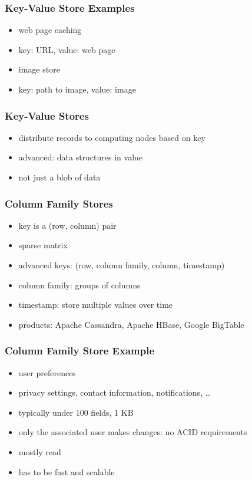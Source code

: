 \documentclass[dvipsnames]{beamer}
\theoremstyle{plain}
\begin{document}
\begin{frame}
  \frametitle{Key-Value Store Examples}

  \begin{itemize}
    \item web page caching
    \item key: URL, value: web page

    \pause
    \medskip
    \item image store
    \item key: path to image, value: image
  \end{itemize}
\end{frame}

\begin{frame}
  \frametitle{Key-Value Stores}

  \begin{itemize}
    \item distribute records to computing nodes based on key

    \medskip
    \item advanced: data structures in value
    \item not just a blob of data
  \end{itemize}
\end{frame}

\begin{frame}
  \frametitle{Column Family Stores}

  \begin{itemize}
    \item key is a (row, column) pair
    \item sparse matrix

    \pause
    \medskip
    \item advanced keys: (row, column family, column, timestamp)
    \item column family: groups of columns
    \item timestamp: store multiple values over time
  \end{itemize}

  \bigskip
  \begin{itemize}
    \item products: Apache Cassandra, Apache HBase, Google BigTable
  \end{itemize}
\end{frame}

\begin{frame}
  \frametitle{Column Family Store Example}

  \begin{itemize}
    \item user preferences
    \item privacy settings, contact information, notifications, \ldots
    \item typically under 100 fields, 1 KB

    \medskip
    \item only the associated user makes changes: no ACID requirements
    \item mostly read
    \item has to be fast and scalable
  \end{itemize}
\end{frame}
\end{document}
